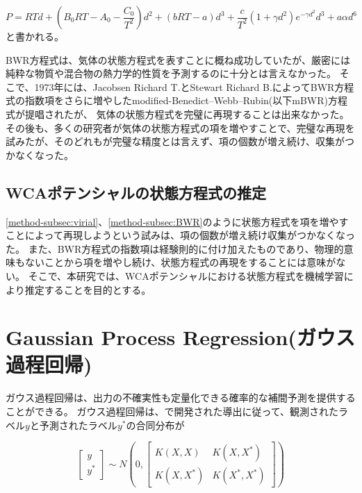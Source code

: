 \documentclass[titlepage]{jsreport}
\begin{document}
\large
\begin{equation}
P=RTd+\left(B_0RT-A_0-{\frac{C_0}{T^2}}\right)d^2+(bRT-a)d^3+{\frac{c}{T^2}}(1+{\gamma}d^2)e^{-{\gamma}d^2}d^3+a{\alpha}d^6\label{eq:BWR}
\end{equation}
\normalsize
と書かれる。

BWR方程式は、気体の状態方程式を表すことに概ね成功していたが、厳密には純粋な物質や混合物の熱力学的性質を予測するのに十分とは言えなかった。
そこで、1973年には、Jacobsen Richard T.とStewart Richard B.によってBWR方程式の指数項をさらに増やしたmodified-Benedict–Webb–Rubin(以下mBWR)方程式が提唱\cite{m-BWR-equation}されたが、
気体の状態方程式を完璧に再現することは出来なかった。
その後も、多くの研究者が気体の状態方程式の項を増やすことで、完璧な再現を試みた\cite{MCCARTY1974276}\cite{BWR-equation:13}\cite{BWR-equation:25}が、そのどれもが完璧な精度とは言えず、項の個数が増え続け、収集がつかなくなった。

\subsection{WCAポテンシャルの状態方程式の推定}\label{method-subsec:WCA-equation}
\ref{method-subsec:virial}、\ref{method-subsec:BWR}のように状態方程式を項を増やすことによって再現しようという試みは、項の個数が増え続け収集がつかなくなった。
また、BWR方程式の指数項は経験則的に付け加えたものであり、物理的意味もないことから項を増やし続け、状態方程式の再現をすることには意味がない。
そこで、本研究では、WCAポテンシャルにおける状態方程式を機械学習により推定することを目的とする。

\section{Gaussian Process Regression(ガウス過程回帰)}\label{method-sec:Gauss}

ガウス過程回帰は、出力の不確実性も定量化できる確率的な補間予測を提供する\cite{machine-learning}ことができる。
ガウス過程回帰は、\cite{Gaussian-Processes-for-Machine-Learning}で開発された導出に従って、観測されたラベル$y$と予測されたラベル$y^*$の合同分布が

\large
\[
    \left[
        \begin{array}{l}
            y \\
            y^* 
        \end{array}
    \right]
    {\sim} N
    \left(0,
        \left[
            \begin{array}{cc}
                K(X,X) & K(X,X^*)\\    
                K(X,X^*) & K(X^*,X^*)
            \end{array}
        \right]
    \right)
\]
\normalsize
\end{document}
